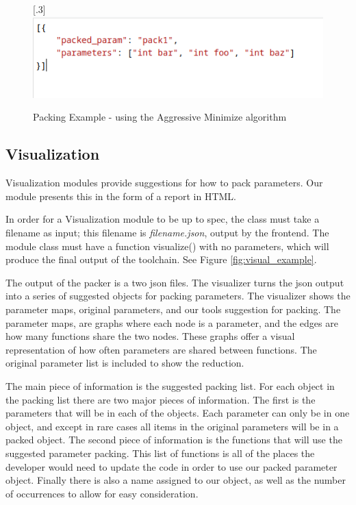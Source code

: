 \documentclass{article}
\begin{document}
\begin{figure}[ht]
{      }%
      \hfill
      [.3\linewidth]{%
        \includegraphics[width=\linewidth]{im5.png}%
      }
      \caption{Packing Example - using the Aggressive Minimize algorithm}
      \label{fig:packer_example}
\end{figure}


\subsection{Visualization}

\noindent Visualization modules provide suggestions for how to pack parameters. Our module presents this in the form of a report in HTML. 

In order for a Visualization module to be up to spec, the class must take a filename as input; this filename is \textit{filename.json}, output by the frontend. The module class must have a function visualize() with no parameters, which will produce the final output of the toolchain. See Figure \ref{fig:visual_example}.

The output of the packer is a two json files. The visualizer turns the json output into a series of suggested objects for packing parameters. 
The visualizer shows the parameter maps, original parameters, and our tools suggestion for packing. The parameter maps, are graphs where each node is a parameter, and the edges are how many functions share the two nodes. These graphs offer a visual representation of how often parameters are shared between functions. The original parameter list is included to show the reduction.

The main piece of information is the suggested packing list. For each object in the packing list there are two major pieces of information. The first is the parameters that will be in each of the objects. Each parameter can only be in one object, and except in rare cases all items in the original parameters will be in a packed object. The second piece of information is the functions that will use the suggested parameter packing. This list of functions is all of the places the developer would need to update the code in order to use our packed parameter object. Finally there is also a name assigned to our object, as well as the number of occurrences to allow for easy consideration. 
\end{document}
